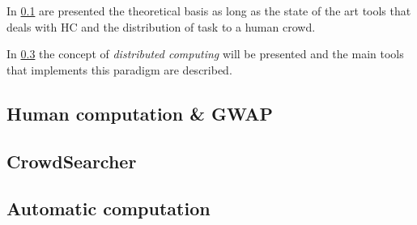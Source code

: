 In \ref{sec:bg:crowd:human} are presented the theoretical basis as long as
the state of the art tools that deals with \ac{HC} and the distribution of task
to a human crowd.

In \ref{sec:bg:crowd:auto} the concept of \emph{distributed computing} will
be presented and the main tools that implements this paradigm are described.


\subsection{Human computation \& \acs{GWAP}}
\label{sec:bg:crowd:human}


\subsection{CrowdSearcher}
\label{sec:bg:crowd:cs}


\subsection{Automatic computation}
\label{sec:bg:crowd:auto}
